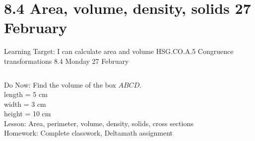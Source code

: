 \section{8.4 Area, volume, density, solids \hfill 27 February \,}
\begin{frame}{Learning Target: I can calculate area and volume}
  {HSG.CO.A.5 Congruence transformations \hfill \alert{8.4 Monday 27 February}}
  \begin{columns}
    Do Now: Find the volume of the box $ABCD$. \\
    length = 5 cm \\
    width = 3 cm\\
    height = 10 cm \\[0.5cm]
    Lesson: Area, perimeter, volume, density, solids, cross sections \\
    Homework: Complete classwork, Deltamath assignment
    \begin{flushright}
    \end{flushright}
  \end{columns}
\end{frame}

